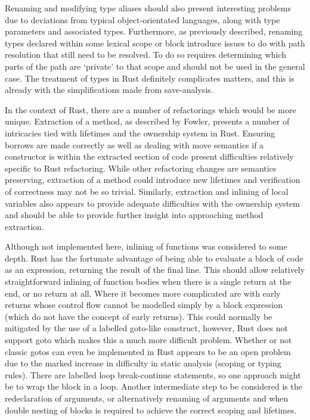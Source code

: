 
Renaming and modifying type aliases should also present interesting problems due to deviations from typical object-orientated languages, along with type parameters and associated types. Furthermore, as previously described, renaming types declared within some lexical scope or block introduce issues to do with path resolution that still need to be resolved. To do so requires determining which parts of the path are `private' to that scope and should not be used in the general case. The treatment of types in Rust definitely complicates matters, and this is already with the simplifications made from save-analysis.

In the context of Rust, there are a number of refactorings which would be more unique. Extraction of a method, as described by Fowler, presents a number of intricacies tied with lifetimes and the ownership system in Rust. Ensuring borrows are made correctly as well as dealing with move semantics if a constructor is within the extracted section of code present difficulties relatively specific to Rust refactoring. While other refactoring changes are semantics preserving, extraction of a method could introduce new lifetimes and verification of correctness may not be so trivial. Similarly, extraction and inlining of local variables also appears to provide adequate difficulties with the ownership system and should be able to provide further insight into approaching method extraction.


Although not implemented here, inlining of functions was considered to some depth. Rust has the fortunate advantage of being able to evaluate a block of code as an expression, returning the result of the final line. This should allow relatively straightforward inlining of function bodies when there is a single return at the end, or no return at all. Where it becomes more complicated are with early returns whose control flow cannot be modelled simply by a block expression (which do not have the concept of early returns). This could normally be mitigated by the use of a labelled goto-like construct, however, Rust does not support goto which makes this a much more difficult problem. Whether or not classic gotos can even be implemented in Rust appears to be an open problem due to the marked increase in difficulty in static analysis (scoping or typing rules). There are labelled loop break-continue statements, so one approach might be to wrap the block in a loop. Another intermediate step to be considered is the redeclaration of arguments, or alternatively renaming of arguments and when double nesting of blocks is required to achieve the correct scoping and lifetimes.

